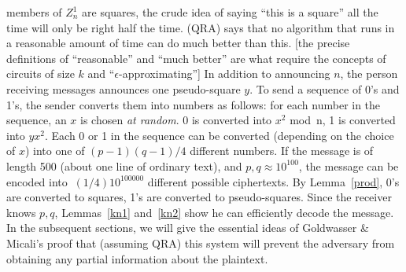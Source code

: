 members of $Z^1_n$ are squares, the crude idea of saying ``this is a
square'' all the time will
only be right half the time.  (QRA) says that no algorithm that runs
in a reasonable amount of time can do much better than this.  [the precise
definitions of ``reasonable'' and ``much better'' are what require the
concepts of circuits of size $k$ and ``$\epsilon$-approximating'']
\pq In addition to announcing $n$, the person receiving messages announces
one pseudo-square $y$.  To send a sequence of 0's and 1's, the sender 
converts them into numbers as follows: for each number in the sequence,
an $x$ is chosen {\it at random}.   0 is converted into $x^2$ mod~n,  1 is
converted into $yx^2$.  Each 0 or 1 in the sequence can be converted
(depending on the choice of $x$) into one of $(p-1)(q-1)/4$ different
numbers.  If the message is of length 500 (about one line of ordinary
text), and $p,q\approx10^{100}$, the message can be encoded into 
$~(1/4)10^{100000}$ different possible ciphertexts.
\pq By Lemma~\ref{prod}, 0's are converted to squares, 1's are converted
to pseudo-squares.  Since the receiver knows $p,q$, Lemmas~\ref{kn1}
and~\ref{kn2} show he can efficiently decode the message.
\pq In the subsequent sections, we will give the essential ideas
of Goldwasser \& Micali's proof that (assuming QRA) this system will
prevent the adversary from 
obtaining any partial information about the plaintext.
